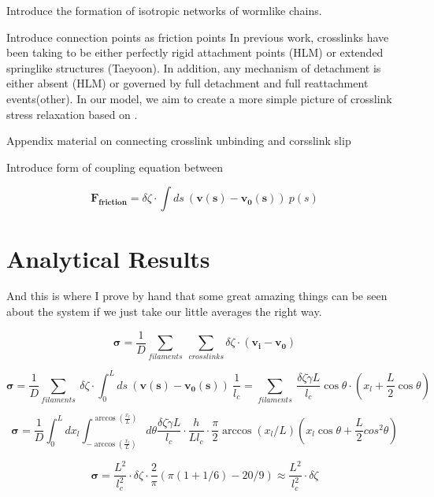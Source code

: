 \documentclass[prb,11pt]{revtex4-1}
\begin{document}
Introduce the formation of isotropic networks of wormlike chains.

Introduce connection points as friction points
{In previous work, crosslinks have been taking to be either perfectly rigid attachment points (HLM) or extended springlike structures (Taeyoon).  In addition, any mechanism of detachment is either absent (HLM) or governed by full detachment and full reattachment events(other).  In our model, we aim to create a more simple picture of crosslink stress relaxation based on .}

Appendix material on connecting crosslink unbinding and corsslink slip

Introduce form of coupling equation between 

\begin{equation}
\mathbf{F_{friction}} = \delta \zeta \cdot \int ds \: (\mathbf{v(s)}-\mathbf{v_0(s)}) \: p(s)
\end{equation}

\section{Analytical Results}
And this is where I prove by hand that some great amazing things can be seen about the system if we just take our little averages the right way.

\begin{equation}
\mathbf{\sigma} = \frac{1}{D}\sum_{filaments}\: \sum_{crosslinks}\delta \zeta \cdot (\mathbf{v_i}-\mathbf{v_0})\end{equation}

\begin{equation}
\mathbf{\sigma} =  \frac{1}{D}\sum_{filaments}\:  \delta \zeta \cdot \int_0^L ds \: (\mathbf{v(s)}-\mathbf{v_0(s)}) \:\frac{1}{l_c} = \sum_{filaments}\:  \frac{\delta \zeta \dot \gamma L}{l_c} \cos \theta \cdot (x_l + \frac{L}{2} \cos \theta)
\end{equation}

\begin{equation}
\mathbf{\sigma} =  \frac{1}{D} \int_0^L dx_l \int_{-\arccos (\frac{x_l}{L})}^{\arccos (\frac{x_l}{L})}d\theta \frac{\delta \zeta \dot \gamma L}{l_c} \cdot \frac{h}{Ll_c}\cdot \frac{\pi}{2}\arccos(x_l/L) (x_l \cos \theta + \frac{L}{2} cos^2\theta)
\end{equation}

\begin{equation}
\mathbf{\sigma} = \frac{L^2}{l_c^2} \cdot \delta \zeta \cdot \frac{2}{\pi}(\pi(1+1/6)-20/9) \approx \frac{L^2}{l_c^2} \cdot \delta \zeta
\end{equation}
\end{document}
